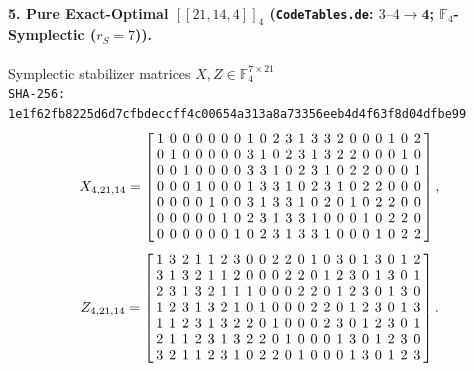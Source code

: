 \documentclass[11pt,a4paper]{article}
\theoremstyle{remark}
\begin{document}
\paragraph{5. Pure Exact-Optimal $[[21,14,4]]_{4}$ (\texttt{CodeTables.de}: $3\text{--}4 \to \mathbf{4}$; $\mathbb{F}_4$-Symplectic ($r_S=7$)).} Symplectic stabilizer matrices $X, Z \in \mathbb{F}_{4}^{7 \times 21}$\\
{\footnotesize\texttt{SHA-256: 1e1f62fb8225d6d7cfbdeccff4c00654a313a8a73356eeb4d4f63f8d04dfbe99}}
{\scriptsize\[
X_{4,21,14} = \setlength{\arraycolsep}{2.1pt}\renewcommand{\arraystretch}{0.95}
\left[\begin{array}{*{21}{r}}
1 & 0 & 0 & 0 & 0 & 0 & 0 & 1 & 0 & 2 & 3 & 1 & 3 & 3 & 2 & 0 & 0 & 0 & 1 & 0 & 2 \\
0 & 1 & 0 & 0 & 0 & 0 & 0 & 3 & 1 & 0 & 2 & 3 & 1 & 3 & 2 & 2 & 0 & 0 & 0 & 1 & 0 \\
0 & 0 & 1 & 0 & 0 & 0 & 0 & 3 & 3 & 1 & 0 & 2 & 3 & 1 & 0 & 2 & 2 & 0 & 0 & 0 & 1 \\
0 & 0 & 0 & 1 & 0 & 0 & 0 & 1 & 3 & 3 & 1 & 0 & 2 & 3 & 1 & 0 & 2 & 2 & 0 & 0 & 0 \\
0 & 0 & 0 & 0 & 1 & 0 & 0 & 3 & 1 & 3 & 3 & 1 & 0 & 2 & 0 & 1 & 0 & 2 & 2 & 0 & 0 \\
0 & 0 & 0 & 0 & 0 & 1 & 0 & 2 & 3 & 1 & 3 & 3 & 1 & 0 & 0 & 0 & 1 & 0 & 2 & 2 & 0 \\
0 & 0 & 0 & 0 & 0 & 0 & 1 & 0 & 2 & 3 & 1 & 3 & 3 & 1 & 0 & 0 & 0 & 1 & 0 & 2 & 2
\end{array}\right],
\]
\[
Z_{4,21,14} = \setlength{\arraycolsep}{2.1pt}\renewcommand{\arraystretch}{0.95}
\left[\begin{array}{*{21}{r}}
1 & 3 & 2 & 1 & 1 & 2 & 3 & 0 & 0 & 2 & 2 & 0 & 1 & 0 & 3 & 0 & 1 & 3 & 0 & 1 & 2 \\
3 & 1 & 3 & 2 & 1 & 1 & 2 & 0 & 0 & 0 & 2 & 2 & 0 & 1 & 2 & 3 & 0 & 1 & 3 & 0 & 1 \\
2 & 3 & 1 & 3 & 2 & 1 & 1 & 1 & 0 & 0 & 0 & 2 & 2 & 0 & 1 & 2 & 3 & 0 & 1 & 3 & 0 \\
1 & 2 & 3 & 1 & 3 & 2 & 1 & 0 & 1 & 0 & 0 & 0 & 2 & 2 & 0 & 1 & 2 & 3 & 0 & 1 & 3 \\
1 & 1 & 2 & 3 & 1 & 3 & 2 & 2 & 0 & 1 & 0 & 0 & 0 & 2 & 3 & 0 & 1 & 2 & 3 & 0 & 1 \\
2 & 1 & 1 & 2 & 3 & 1 & 3 & 2 & 2 & 0 & 1 & 0 & 0 & 0 & 1 & 3 & 0 & 1 & 2 & 3 & 0 \\
3 & 2 & 1 & 1 & 2 & 3 & 1 & 0 & 2 & 2 & 0 & 1 & 0 & 0 & 0 & 1 & 3 & 0 & 1 & 2 & 3
\end{array}\right].
\]}
\end{document}
